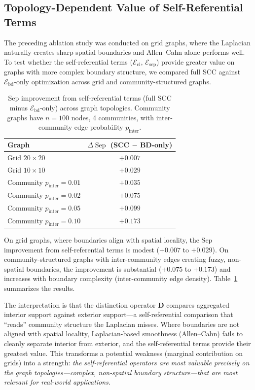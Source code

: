 \documentclass[lettersize,journal]{IEEEtran}
\DeclareMathOperator{\Sep}{Sep}
\begin{document}
\subsection{Topology-Dependent Value of Self-Referential Terms}

The preceding ablation study was conducted on grid graphs, where the Laplacian naturally creates sharp spatial boundaries and Allen--Cahn alone performs well. To test whether the self-referential terms ($\mathcal{E}_{\mathrm{cl}}$, $\mathcal{E}_{\mathrm{sep}}$) provide greater value on graphs with more complex boundary structure, we compared full SCC against $\mathcal{E}_{\mathrm{bd}}$-only optimization across grid and community-structured graphs.

\begin{table}[!t]
\centering
\caption{Sep improvement from self-referential terms (full SCC minus $\mathcal{E}_{\mathrm{bd}}$-only) across graph topologies. Community graphs have $n=100$ nodes, 4 communities, with inter-community edge probability $p_{\mathrm{inter}}$.}
\label{tab:topology}
\begin{tabular}{lc}
\hline
Graph & $\Delta\Sep$ (SCC $-$ BD-only) \\
\hline
Grid $20 \times 20$ & $+0.007$ \\
Grid $10 \times 10$ & $+0.029$ \\
Community $p_{\mathrm{inter}}=0.01$ & $+0.035$ \\
Community $p_{\mathrm{inter}}=0.02$ & $+0.075$ \\
Community $p_{\mathrm{inter}}=0.05$ & $+0.099$ \\
Community $p_{\mathrm{inter}}=0.10$ & $+0.173$ \\
\hline
\end{tabular}
\end{table}

On grid graphs, where boundaries align with spatial locality, the Sep improvement from self-referential terms is modest ($+0.007$ to $+0.029$). On community-structured graphs with inter-community edges creating fuzzy, non-spatial boundaries, the improvement is substantial ($+0.075$ to $+0.173$) and increases with boundary complexity (inter-community edge density). Table~\ref{tab:topology} summarizes the results.

The interpretation is that the distinction operator $\mathbf{D}$ compares aggregated interior support against exterior support---a self-referential comparison that ``reads'' community structure the Laplacian misses. Where boundaries are not aligned with spatial locality, Laplacian-based smoothness (Allen--Cahn) fails to cleanly separate interior from exterior, and the self-referential terms provide their greatest value. This transforms a potential weakness (marginal contribution on grids) into a strength: \emph{the self-referential operators are most valuable precisely on the graph topologies---complex, non-spatial boundary structure---that are most relevant for real-world applications.}
\end{document}
